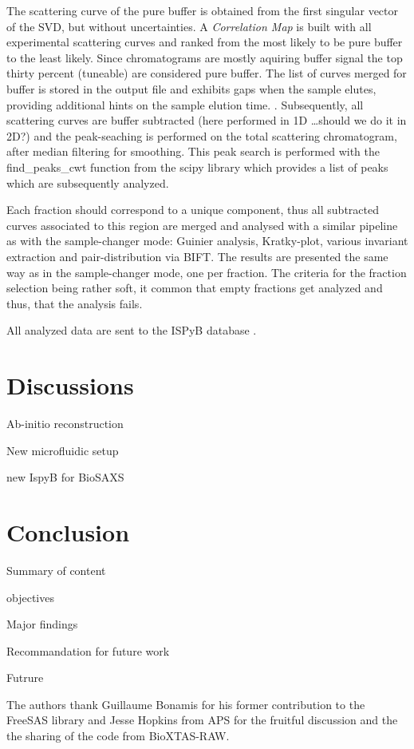 \documentclass[preprint]{iucr}              %
\begin{document}
The scattering curve of the pure buffer is obtained from the first singular vector of the SVD, but without uncertainties.
A \textit{Correlation Map} is built with all experimental scattering curves and ranked from the  most likely to be pure buffer
to the least likely. 
Since chromatograms are mostly aquiring buffer signal the top thirty percent (tuneable) are considered pure buffer.
The list of curves merged for buffer is stored in the output file and exhibits gaps when the sample elutes, 
providing additional hints on the sample elution time. .    
Subsequently, all scattering curves are buffer subtracted (here performed in 1D \ldots should we do it in 2D?) and the
peak-seaching is performed on the total scattering chromatogram, after median filtering for smoothing.
This peak search is performed with the find\_peaks\_cwt function from the scipy library \cite{scipy} which provides a
list of peaks which are subsequently analyzed.

Each fraction should correspond to a unique component, thus all subtracted curves associated to this region are merged and analysed
with a similar pipeline as with the sample-changer mode: Guinier analysis, Kratky-plot, various invariant extraction and 
pair-distribution via BIFT. 
The results are presented the same way as in the sample-changer mode, one per fraction.
The criteria for the fraction selection being rather soft, it common that empty fractions get analyzed and thus, 
that the analysis fails. 

All analyzed data are sent to the ISPyB database \cite{ISPYBB}.     

\section{Discussions}


Ab-initio reconstruction

New microfluidic setup

new IspyB for BioSAXS

\section{Conclusion}

Summary of content

objectives

Major findings 

Recommandation for future work

Futrure 

The authors thank Guillaume Bonamis for his former contribution to the FreeSAS library and Jesse Hopkins from APS for the fruitful 
discussion and the the sharing of the code from BioXTAS-RAW.





\end{document}
